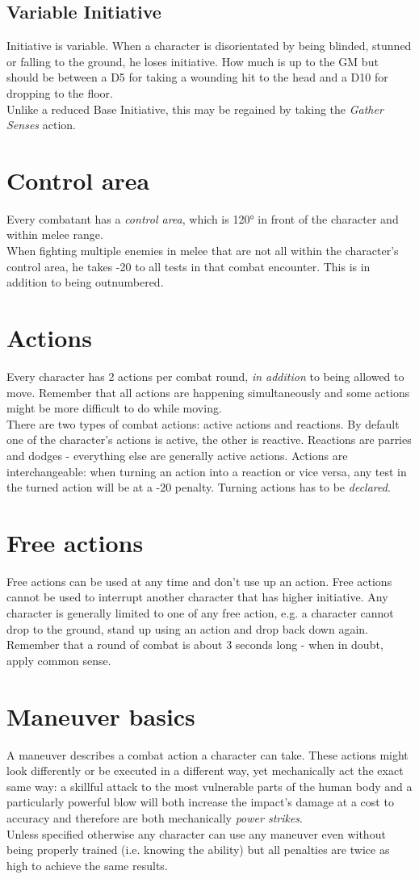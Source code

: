 \subsection{Variable Initiative}
\label{subsec:variableini}
Initiative is variable. When a character is disorientated by being blinded, stunned or falling to the ground, he loses initiative. How much is up to the GM but should be between a D5 for taking a wounding hit to the head and a D10 for dropping to the floor.
\\%
Unlike a reduced Base Initiative, this may be regained by taking the \emph{Gather Senses} action.
\section{Control area}
Every combatant has a \emph{control area}, which is 120° in front of the character and within melee range. \\
When fighting multiple enemies in melee
	that are not all within the character's control area,
	he takes -20 to all tests in that combat encounter.
This is in addition to being outnumbered.
\section{Actions}
Every character has 2 actions per combat round, \emph{in addition} to being allowed to move. Remember that all actions are happening simultaneously and some actions might be more difficult to do while moving.\\
There are two types of combat actions: active actions and reactions.
By default one of the character’s actions is active, the other is reactive.
Reactions are parries and dodges - everything else are generally active actions.
Actions are interchangeable:
	when turning an action into a reaction or vice versa,
	any test in the turned action will be at a -20 penalty.
Turning actions has to be \emph{declared}.
\section{Free actions}
Free actions can be used at any time and don't use up an action. Free actions cannot be used to interrupt another character that has higher initiative. Any character is generally limited to one of any free action, e.g. a character cannot drop to the ground, stand up using an action and drop back down again. Remember that a round of combat is about 3 seconds long - when in doubt, apply common sense.
\section{Maneuver basics}
A maneuver describes a combat action a character can take.
These actions might look differently or be executed in a different way,
	yet mechanically act the exact same way:
	a skillful attack to the most vulnerable parts of the human body
	and a particularly powerful blow
	will both increase the impact’s damage
	at a cost to accuracy
	and therefore are both mechanically \textit{power strikes}.\\
Unless specified otherwise any character can use any maneuver even without being properly trained (i.e. knowing the ability) but all penalties are twice as high to achieve the same results.
